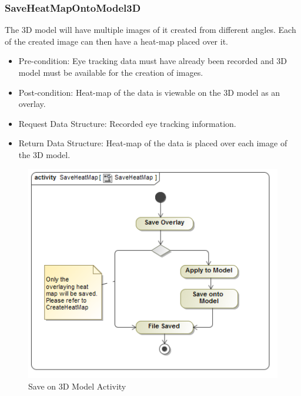 	\subsubsection{SaveHeatMapOntoModel3D}
	The 3D model will have multiple images of it created from different angles. Each of the created image can then have a heat-map placed over it.
	\begin{itemize}
		\item Pre-condition: Eye tracking data must have already been recorded and 3D model must be available for the creation of images.
		\item Post-condition: Heat-map of the data is viewable on the 3D model as an overlay.
		\item Request Data Structure: Recorded eye tracking information.
		\item Return Data Structure: Heat-map of the data is placed over each image of the 3D model.
	\end{itemize}
	\begin{figure}[!ht]
		\centering	
		\includegraphics[scale=0.5,width=15cm,keepaspectratio]{Diagrams/Activity_Diagram__SaveHeatMap__SaveHeatMap.png}	
		\caption{Save on 3D Model Activity}
	\end{figure}
	
	
